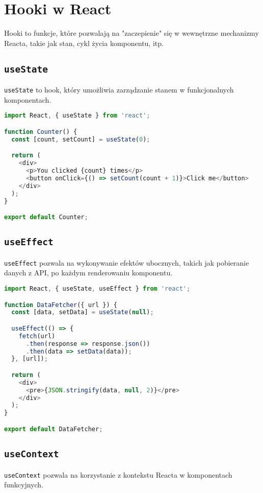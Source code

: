 \documentclass[a4paper,12pt]{article}
\begin{document}
\section{Hooki w React}
Hooki to funkcje, które pozwalają na "zaczepienie" się w wewnętrzne mechanizmy Reacta, takie jak stan, cykl życia komponentu, itp.

\subsection{\texttt{useState}}
\texttt{useState} to hook, który umożliwia zarządzanie stanem w funkcjonalnych komponentach.

\begin{lstlisting}[language=JavaScript, caption=Przykład użycia \texttt{useState}]
import React, { useState } from 'react';

function Counter() {
  const [count, setCount] = useState(0);

  return (
    <div>
      <p>You clicked {count} times</p>
      <button onClick={() => setCount(count + 1)}>Click me</button>
    </div>
  );
}

export default Counter;
\end{lstlisting}

\subsection{\texttt{useEffect}}
\texttt{useEffect} pozwala na wykonywanie efektów ubocznych, takich jak pobieranie danych z API, po każdym renderowaniu komponentu.

\begin{lstlisting}[language=JavaScript, caption=Przykład użycia \texttt{useEffect}]
import React, { useState, useEffect } from 'react';

function DataFetcher({ url }) {
  const [data, setData] = useState(null);

  useEffect(() => {
    fetch(url)
      .then(response => response.json())
      .then(data => setData(data));
  }, [url]);

  return (
    <div>
      <pre>{JSON.stringify(data, null, 2)}</pre>
    </div>
  );
}

export default DataFetcher;
\end{lstlisting}

\subsection{\texttt{useContext}}
\texttt{useContext} pozwala na korzystanie z kontekstu Reacta w komponentach funkcyjnych.
\end{document}
